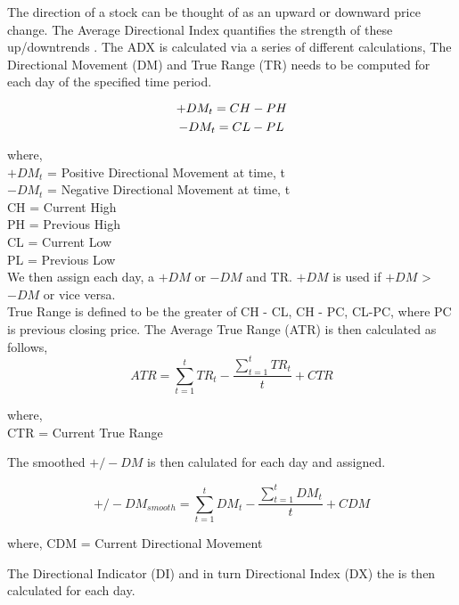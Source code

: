 The direction of a stock can be thought of as an upward or downward price change. The Average Directional Index quantifies the strength of these up/downtrends \cite{??}. The ADX is calculated via a series of different calculations, The Directional Movement (DM) and True Range (TR) needs to be computed for each day of the specified time period. 

\begin{equation}
    +DM_t = CH - PH \\
\end{equation}
\begin{equation}
    -DM_t = CL - PL \\
\end{equation}
    


\noindent where, \\
$+DM_t$ = Positive Directional Movement at time, t \\
$-DM_t$ = Negative Directional Movement at time, t \\
CH = Current High \\
PH = Previous High \\
CL = Current Low \\
PL = Previous Low \\

\noindent We then assign each day, a $+DM$ or $-DM$ and TR. $+DM$ is used if $+DM$ > $-DM$ or vice versa. \\

\noindent True Range is defined to be the greater of CH - CL, CH - PC, CL-PC, where PC is previous closing price. The Average True Range (ATR) is then calculated as follows, \\

\begin{equation}
    ATR = \sum^{t}_{t=1}TR_t - \frac{\sum^{t}_{t=1}TR_t}{t} + CTR
\end{equation}

\noindent where, \\
CTR = Current True Range

\noindent The smoothed $+/-DM$ is then calulated for each day and assigned.

\begin{equation}
    +/-DM_{smooth} = \sum^{t}_{t=1}DM_t - \frac{\sum^{t}_{t=1}DM_t}{t} + CDM
\end{equation}

\noindent where, 
CDM = Current Directional Movement

\noindent The Directional Indicator (DI) and in turn Directional Index (DX) the is then calculated for each day.

